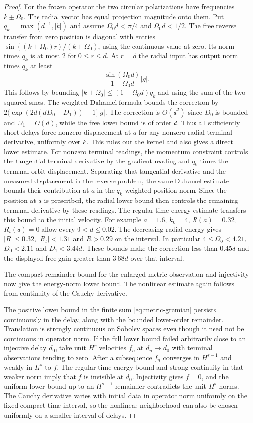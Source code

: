 \begin{proof}
For the frozen operator the two circular
polarizations have frequencies $k\pm\Omega_0$.
The radial vector has equal projection magnitude
onto them. Put $q_k=\max(d^{-1},|k|)$
and assume $\Omega_0d<\pi/4$ and $\Omega_0d<1/2$.
The free reverse transfer from zero position
is diagonal with entries $\sin((k\pm\Omega_0)r)/
(k\pm\Omega_0)$, using the continuous value at
zero. Its norm times $q_k$ is at most $2$ for
$0\le r\le d$. At $r=d$ the radial input has
output norm times $q_k$ at least
\[
 \frac{\sin(\Omega_0d)}{1+\Omega_0 d}|g|.
\]
This follows by bounding
$|k\pm\Omega_0|\le(1+\Omega_0d)q_k$ and using the
sum of the two squared sines. The weighted
Duhamel formula bounds the correction by
$2\big(\exp(2d(dD_0+D_1))-1\big)|g|$.
The correction is $O(d^2)$ since $D_0$ is bounded
and $D_1=O(d)$, while the free lower bound is of
order $d$. Thus all sufficiently short delays
force nonzero displacement at $a$ for any nonzero
radial terminal derivative, uniformly over $k$.
This rules out the kernel and also gives a direct
lower estimate. For nonzero terminal readings,
the momentum constraint controls the tangential
terminal derivative by the gradient reading and
$q_k$ times the terminal orbit displacement.
Separating that tangential derivative and the measured
displacement in the reverse problem, the same
Duhamel estimate bounds their contribution at $a$
in the $q_k$-weighted position norm. Since the
position at $a$ is prescribed, the radial lower
bound then controls the remaining terminal
derivative by these readings. The regular-time
energy estimate transfers this bound to the initial
velocity. For example $a=1.6$,
$k_0=4$, $R(a)=0.32$, $R_t(a)=0$ allow every
$0<d\le0.02$. The decreasing radial energy
gives $|R|\le0.32$, $|R_t|<1.31$ and $R>0.29$ on
the interval. In particular $4\le\Omega_0<4.21$,
$D_0<2.11$ and $D_1<3.44d$. These bounds
make the correction less than $0.45d$
and the displayed free gain greater than $3.68d$
over that interval.

The compact-remainder bound for the enlarged
metric observation and injectivity now give the
energy-norm lower bound. The nonlinear estimate
again follows from continuity of the Cauchy derivative.

The positive lower bound in the finite sum
\eqref{eq:metric-gramian} persists continuously
in the delay, along with the bounded lower-order
remainder. Translation is strongly continuous on
Sobolev spaces even though it need not be continuous
in operator norm. If the full lower bound failed
arbitrarily close to an injective delay $d_0$, take
unit $H^s$ velocities $f_n$ at $d_n\to d_0$
with terminal observations tending to zero.
After a subsequence $f_n$ converges in $H^{s-1}$
and weakly in $H^s$ to $f$.
The regular-time energy bound and strong
continuity in that weaker norm imply that $f$
is invisible at $d_0$. Injectivity gives $f=0$,
and the uniform lower bound up to an $H^{s-1}$
remainder contradicts the unit $H^s$ norms.
The Cauchy derivative varies with initial data
in operator norm uniformly on the fixed compact
time interval, so the nonlinear neighborhood
can also be chosen uniformly on a smaller
interval of delays.
\end{proof}

